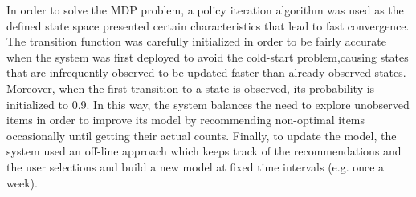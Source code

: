 
In order to solve the MDP problem, a policy iteration algorithm was used as the defined state space presented certain characteristics that lead to fast convergence.
The transition function was carefully initialized in order to be fairly accurate when the system was first deployed to avoid the cold-start problem,causing states that are infrequently observed to be updated faster than already observed states. Moreover, when the first transition to a state is observed, its probability is initialized to 0.9. In this way, the system balances the need to explore unobserved items in order to improve its model by recommending non-optimal items occasionally until getting their actual counts.
Finally, to update the model, the system used an off-line approach which keeps track of the recommendations and the user selections and build a new model at fixed time intervals (e.g. once a week).


